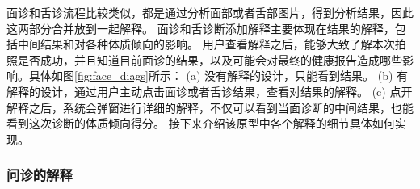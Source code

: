 面诊和舌诊流程比较类似，都是通过分析面部或者舌部图片，得到分析结果，因此这两部分合并放到一起解释。
面诊和舌诊断添加解释主要体现在结果的解释，包括中间结果和对各种体质倾向的影响。
用户查看解释之后，能够大致了解本次拍照是否成功，并且知道目前面诊的结果，以及可能会对最终的健康报告造成哪些影响。具体如图\ref{fig:face_diags}所示：
(a) 没有解释的设计，只能看到结果。
(b) 有解释的设计，通过用户主动点击面诊或者舌诊结果，查看对结果的解释。
(c) 点开解释之后，系统会弹窗进行详细的解释，不仅可以看到当面诊断的中间结果，也能看到这次诊断的体质倾向得分。
接下来介绍该原型中各个解释的细节具体如何实现。


\subsubsection{问诊的解释}

\begin{figure}[htbp]
    \centering

\end{figure}

